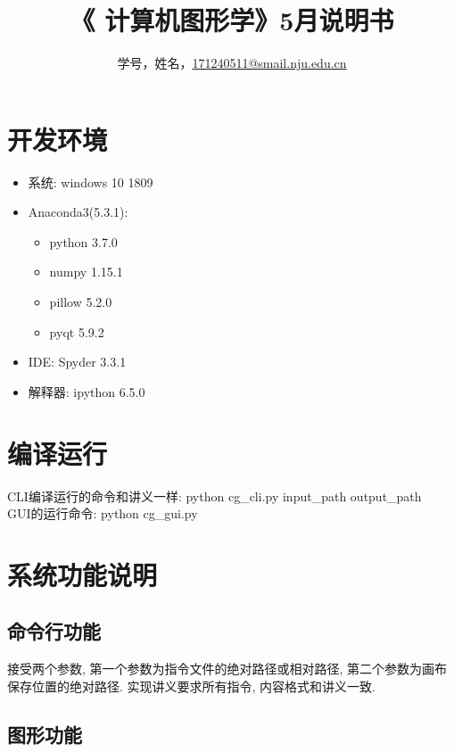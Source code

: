 \documentclass[a4paper,UTF8]{article}
\theoremstyle{definition}
\begin{document}
\title{\textbf{《 计算机图形学》5月说明书}}
\author{学号，姓名，\href{mailto:xxx@xxx.com}{171240511@smail.nju.edu.cn}}
\maketitle

\section{开发环境}
\begin{itemize}
\item 系统: windows 10 1809
\item Anaconda3(5.3.1): 
	\begin{itemize}
		\item python 3.7.0
		\item numpy 1.15.1
		\item pillow 5.2.0
		\item pyqt 5.9.2
	\end{itemize}
\item IDE: Spyder 3.3.1
\item 解释器: ipython 6.5.0
\end{itemize}
\section{编译运行}
CLI编译运行的命令和讲义一样: python cg\_cli.py input\_path output\_path\\
\indent GUI的运行命令: python cg\_gui.py
\section{系统功能说明}
\subsection{命令行功能}
接受两个参数, 第一个参数为指令文件的绝对路径或相对路径, 第二个参数为画布保存位置的绝对路径.
实现讲义要求所有指令, 内容格式和讲义一致.
\subsection{图形功能}
\end{document}

